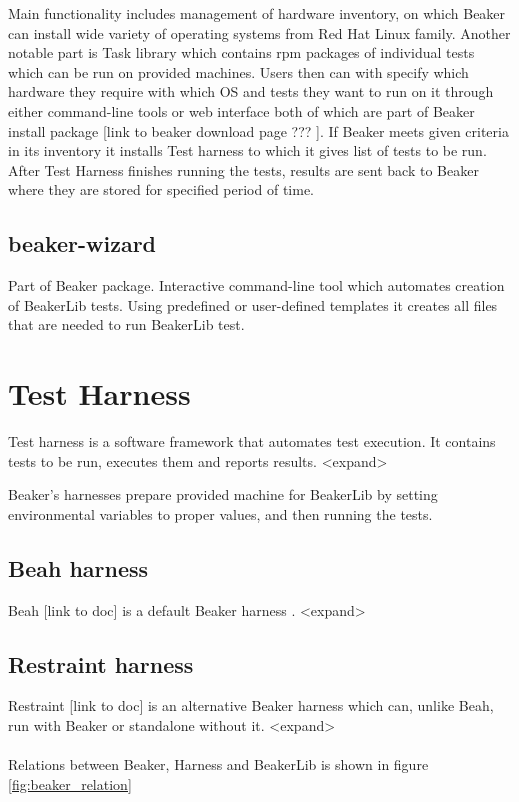 Main functionality includes management of hardware inventory, on which Beaker can install wide variety  of operating systems from Red Hat Linux family. Another notable part  is Task library which contains rpm packages of individual tests which can be run on provided machines. 
Users then can with specify which hardware they require with which OS and tests they want to run on it through either command-line tools or web interface both of which are part of Beaker install package [link to beaker download page ??? ]. If Beaker meets given criteria in its inventory it installs Test harness to which it gives list of tests to be run.  After Test Harness finishes running the tests, results are sent back to Beaker where they are stored for specified period of time. 

\subsection{beaker-wizard}
Part of Beaker package. Interactive command-line tool which automates creation of BeakerLib tests. Using predefined or user-defined templates it creates all files that are needed to run BeakerLib test.

\section{Test Harness}
Test harness is a software framework that automates test execution. It contains tests to be run, executes them and reports results. <expand>

Beaker’s harnesses prepare provided machine for BeakerLib by setting environmental variables to proper values, and then running the tests.

\subsection{Beah harness}
Beah [link to doc] is a default Beaker harness . <expand> 

\subsection{Restraint harness}
Restraint [link to doc] is an alternative Beaker harness which can, unlike Beah, run with Beaker or standalone without it. <expand>
\\
\\
Relations between Beaker, Harness and BeakerLib is shown in figure \ref{fig:beaker_relation}

